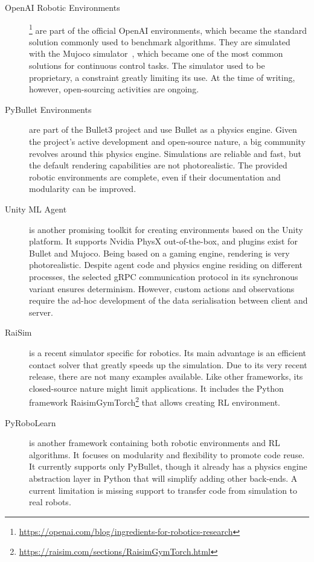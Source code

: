 \begin{description}

\item[OpenAI Robotic Environments]\!\!\footnote{\url{https://openai.com/blog/ingredients-for-robotics-research}}
are part of the official OpenAI environments, which became the standard solution commonly used to benchmark algorithms.
They are simulated with the Mujoco simulator~\parencite{todorov_mujoco_2012}, which became one of the most common solutions for continuous control tasks.
The simulator used to be proprietary, a constraint greatly limiting its use.
At the time of writing, however, open-sourcing activities are ongoing.

\item[PyBullet Environments]\!\parencite{coumans_pybullet_2016}
are part of the Bullet3 project and use Bullet as a physics engine.
Given the project's active development and open-source nature, a big community revolves around this physics engine.
Simulations are reliable and fast, but the default rendering capabilities are not photorealistic.
The provided robotic environments are complete, even if their documentation and modularity can be improved.

\item[Unity ML Agent]\!\parencite{juliani_unity_2018} is another promising toolkit for creating environments based on the Unity platform.
It supports Nvidia PhysX out-of-the-box, and plugins exist for Bullet and Mujoco.
Being based on a gaming engine, rendering is very photorealistic.
Despite agent code and physics engine residing on different processes, the selected gRPC communication protocol in its synchronous variant ensures determinism.
However, custom actions and observations require the ad-hoc development of the data serialisation between client and server.

\item[RaiSim]\!\parencite{hwangbo_per-contact_2018} is a recent simulator specific for robotics.
Its main advantage is an efficient contact solver that greatly speeds up the simulation.
Due to its very recent release, there are not many examples available.
Like other frameworks, its closed-source nature might limit applications.
It includes the Python framework RaisimGymTorch\footnote{\url{https://raisim.com/sections/RaisimGymTorch.html}} that allows creating \ac{RL} environment.

\item[PyRoboLearn]\!\parencite{delhaisse_pyrobolearn_2019} is another framework containing both robotic environments and RL algorithms.
It focuses on modularity and flexibility to promote code reuse.
It currently supports only PyBullet, though it already has a physics engine abstraction layer in Python that will simplify adding other back-ends.
A current limitation is missing support to transfer code from simulation to real robots.


\end{description}
